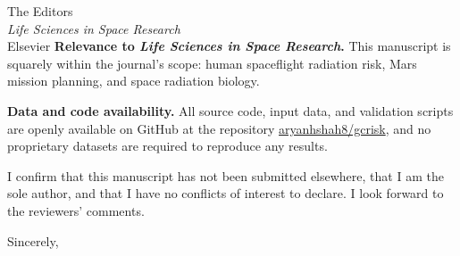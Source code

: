 \documentclass[11pt,letterpaper]{letter}
\begin{document}
\begin{letter}{The Editors\\
  \textit{Life Sciences in Space Research}\\
  Elsevier}
\medskip
\textbf{Relevance to \textit{Life Sciences in Space Research}.}
This manuscript is squarely within the journal's scope: human
spaceflight radiation risk, Mars mission planning, and space radiation
biology.

\medskip
\textbf{Data and code availability.}
All source code, input data, and validation scripts are openly available
on GitHub at the repository
\href{https://github.com/aryanhshah8/gcrisk}{aryanhshah8/gcrisk},
and no proprietary datasets are required to reproduce any results.

\medskip
I confirm that this manuscript has not been submitted elsewhere, that I
am the sole author, and that I have no conflicts of interest to declare.
I look forward to the reviewers' comments.

\closing{Sincerely,}

\end{letter}
\end{document}

